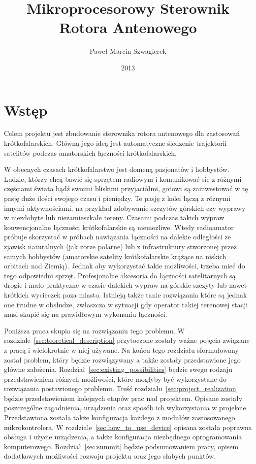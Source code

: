 \documentclass[eng,oneside]{mgr}
\title{Mikroprocesorowy Sterownik Rotora Antenowego}
\author{Paweł Marcin Szwagierek}
\date{2013}
\begin{document}
	 
	\maketitle

	\tableofcontents

	\chapter{Wstęp}
	Celem projektu jest zbudowanie sterownika rotora antenowego dla zastosowań krótkofalarskich. Główną jego ideą jest automatyczne śledzenie trajektorii satelitów podczas amatorskich łączności krótkofalarskich. 

	W obecnych czasach krótkofalarstwo jest domeną pasjonatów i hobbystów. Ludzie, którzy chcą bawić się sprzętem radiowym i komunikować się z różnymi częściami świata bądź swoimi bliskimi przyjaciółmi, gotowi są zainwestować w tę pasję duże ilości swojego czasu i pieniędzy. Te pasję z kolei łączą z różnymi innymi aktywnościami, na przykład zdobywanie szczytów górskich czy wyprawy w niezdobyte lub niezamieszkałe tereny. Czasami podczas takich wypraw konwencjonalne łączności krótkofalarskie są niemożliwe. Wtedy radioamator próbuje skorzystać w próbach nawiązania łączności na dalekie odległości ze zjawisk naturalnych (jak zorze polarne) lub z infrastruktury stworzonej przez samych hobbystów (amatorskie satelity krótkofalarskie krążące na niskich orbitach nad Ziemią). Jednak aby wykorzystać takie możliwości, trzeba mieć do tego odpowiedni sprzęt. Profesjonalne akcesoria do łączności satelitarnych są drogie i mało praktyczne w czasie dalekich wypraw na górskie szczyty lub nawet krótkich wycieczek poza miasto. Istnieją także tanie rozwiązania które są jednak one trudne w obsłudze, zwłaszcza w sytuacji gdy operator takiej terenowej stacji musi skupić się na prawidłowym wykonaniu łączności.

	Poniższa praca skupia się na rozwiązaniu tego problemu. W rozdziale~\ref{sec:teoretical_description} przytoczone zostały ważne pojęcia związane z pracą i wielokrotnie w niej używane. Na końcu tego rozdziału sformułowany został problem, który będzie rozwiązywany a także  zostały przedstawione jego główne założenia. Rozdział~\ref{sec:existing_possibilities} będzie swego rodzaju przedstawieniem różnych możliwości, które mogłyby być wykorzystane do rozwiązania postawionego problemu. Treść rozdziału~\ref{sec:project_realization} będzie przedstawieniem kolejnych etapów prac nad projektem. Opisane zostały poszczególne zagadnienia, urządzenia oraz sposób ich wykorzystania w projekcie. Przedstawiona została także konfiguracja każdego z modułów zastosowanego mikrokontrolera. W rozdziale~\ref{sec:how_to_use_device} opisana została poprawna obsługa i użycie urządzenia, a także konfiguracja niezbędnego oprogramowania komputerowego. Rozdział~\ref{sec:summit} będzie podsumowaniem pracy, opisem dodatkowych możliwości rozwoju projektu oraz jego słabych punktów.
\end{document}
